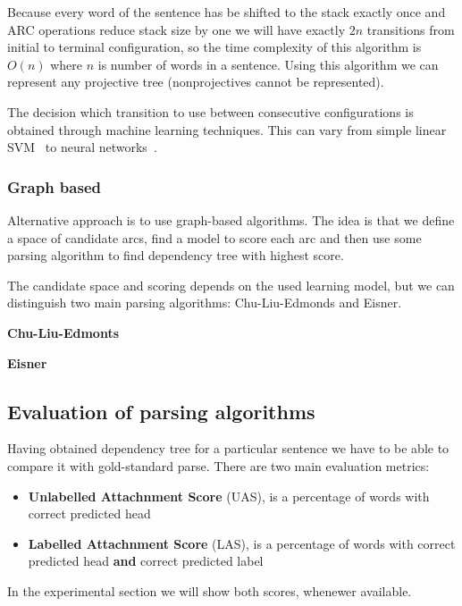 Because every word of the sentence has be shifted to the stack exactly once
and {\ttfamily ARC} operations reduce stack size by one we will have exactly
$2n$ transitions from initial to terminal configuration, so the time complexity of this
algorithm is $O(n)$ where $n$ is number of words in a sentence.
Using this algorithm we can represent any projective tree 
\cite{nivre_algorithms_2008} (nonprojectives cannot be represented).

The decision which transition to use between consecutive configurations is
obtained through machine learning techniques. This can vary from simple
linear SVM~\cite{nivre_maltparser:_2005} to neural networks~\cite{chen_fast_2014,
andor_globally_2016}.

\subsubsection{Graph based}
Alternative approach is to use graph-based algorithms. The idea is that we define
a space of candidate arcs, find a model to score each arc and then use some parsing
algorithm to find dependency tree with highest score.

The candidate space and scoring depends on the used learning model, but we can
distinguish two main parsing algorithms: Chu-Liu-Edmonds and Eisner.

\noindent
\textbf{Chu-Liu-Edmonts}

\noindent
\textbf{Eisner}

\subsection{Evaluation of parsing algorithms}
Having obtained dependency tree for a particular sentence we have to be able
to compare it with gold-standard parse.
There are two main evaluation metrics:
\begin{itemize}
    \item \textbf{Unlabelled Attachnment Score} (UAS), is a percentage of words
        with correct predicted head
    \item \textbf{Labelled Attachnment Score} (LAS), is a percentage of words
        with correct predicted head \textbf{and} correct predicted label
\end{itemize}
In the experimental section we will show both scores, whenewer available.

